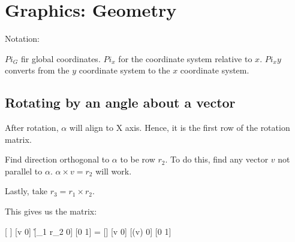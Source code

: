 \section{Graphics: Geometry}

Notation: 

$Pi_G$ fir global coordinates. $Pi_x$ for the coordinate system relative to $x$.
$Pi_xy$ converts  from the $y$ coordinate system to the $x$ coordinate system.


\subsection{Rotating by an angle about a vector}

After rotation, $\alpha$ will align to X axis. Hence, it is the first row of the rotation matrix.

Find direction orthogonal to $\alpha$ to be row $r_2$. To do this, find any vector $v$ not parallel to $\alpha$.
$\alpha \times v = r_2$ will work.


Lastly, take $r_3 = r_1 \times r_2$.

This gives us the matrix:


[ ]
[\alpha \times v 0]
[\r_1 \times r_2 0]
[0 1]
= 
[]
[\alpha \times v 0]
[\alpha \times (\alpha \times v) 0]
[0 1]


